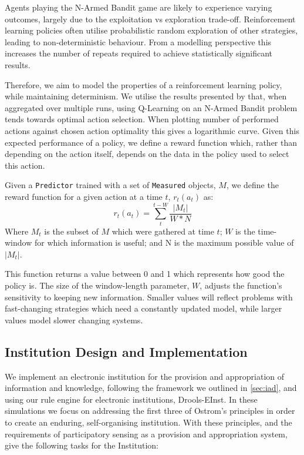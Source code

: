 Agents playing the N-Armed Bandit game are likely to experience varying
outcomes, largely due to the exploitation vs exploration trade-off.
Reinforcement learning policies often utilise probabilistic random exploration
of other strategies, leading to non-deterministic behaviour. From a modelling
perspective this increases the number of repeats required to achieve
statistically significant results.

Therefore, we aim to model the properties of a reinforcement learning policy,
while maintaining determinism. We utilise the results presented by
\citet[ch.2]{Sutton1998} that, when aggregated over multiple runs, using
Q-Learning on an N-Armed Bandit problem tends towards optimal action
selection. When plotting number of performed actions against chosen action
optimality this gives a logarithmic curve. Given this expected performance of
a policy, we define a reward function which, rather than depending on the
action itself, depends on the data in the policy used to select this action.

Given a \texttt{Predictor} trained with a set of \texttt{Measured} objects, $M$, we define the reward function for a given action at a time $t$, $r_t(a_t)$ as:
\begin{equation*}
r_t(a_t) = \sum_t^{t-W} \frac{|M_t|}{W*N}
\end{equation*}
Where $M_t$ is the subset of $M$ which were gathered at time $t$; $W$ is the time-window for which information is useful; and N is the maximum possible value of $|M_t|$.

This function returns a value between 0 and 1 which represents how good the
policy is. The size of the window-length parameter, $W$, adjusts the
function's sensitivity to keeping new information. Smaller values will reflect
problems with fast-changing strategies which need a constantly updated model,
while larger values model slower changing systems.

\subsection{Institution Design and Implementation}

We implement an electronic institution for the provision and appropriation of
information and knowledge, following the framework we outlined in
\autoref{sec:iad}, and using our rule engine for electronic institutions,
Drools-EInst. In these simulations we focus on addressing the first three of
Ostrom's principles in order to create an enduring, self-organising
institution. With these principles, and the requirements of participatory sensing as a provision and appropriation system, give the following tasks for the Institution:

